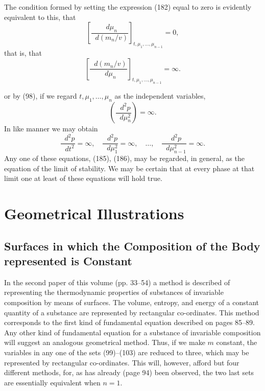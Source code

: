 \documentclass[11pt]{article}
\newcommand{\dd}{\mathop{}\!d}
\begin{document}
The condition formed by setting the expression (182) equal to zero is evidently equivalent to this, that
\begin{equation}
\left[\frac{\dd\mu_n}{\dd\left(m_n/v\right)}\right]_{t,\mu_1,\ldots,\mu_{n-1}}=0,
\end{equation}
that is, that
\begin{equation}
\left[\frac{\dd\left(m_n/v\right)}{\dd\mu_n}\right]_{t,\mu_1,\ldots,\mu_{n-1}}=\infty.
\end{equation}



or by (98), if we regard $t,\mu_1,\ldots,\mu_n$ as the independent variables,
\begin{equation}\label{eq:gibbs-v1-p3-185}
\left(\frac{\dd^2 p}{\dd\mu_n^2}\right)=\infty .\tag{185}
\end{equation}
In like manner we may obtain
\begin{equation}\label{eq:gibbs-v1-p3-186}
\frac{\dd^2p}{\dd t^2}=\infty,\quad
\frac{\dd^2p}{\dd\mu_1^2}=\infty,\quad\ldots,\quad
\frac{\dd^2p}{\dd\mu_{n-1}^2}=\infty .\tag{186}
\end{equation}
Any one of these equations, (185), (186), may be regarded, in general, as the equation of the limit of stability. We may be certain that at every phase at that limit one at least of these equations will hold true.

\section*{Geometrical Illustrations}

\subsection*{Surfaces in which the Composition of the Body represented is Constant}

In the second paper of this volume (pp. 33--54) a method is described of representing the thermodynamic properties of substances of invariable composition by means of surfaces. The volume, entropy, and energy of a constant quantity of a substance are represented by rectangular co-ordinates. This method corresponds to the first kind of fundamental equation described on pages 85--89. Any other kind of fundamental equation for a substance of invariable composition will suggest an analogous geometrical method. Thus, if we make $m$ constant, the variables in any one of the sets (99)--(103) are reduced to three, which may be represented by rectangular co-ordinates. This will, however, afford but four different methods, for, as has already (page 94) been observed, the two last sets are essentially equivalent when $n=1$.
\end{document}
